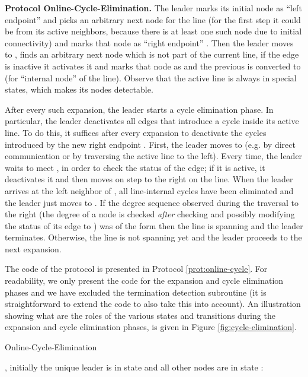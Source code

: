 \documentclass[preprint]{elsarticle}
\begin{document}
\noindent\textbf{Protocol Online-Cycle-Elimination.} The leader marks its initial node as ``left endpoint''  and picks an arbitrary next node for the line (for the first step it could be from its active neighbors, because there is at least one such node due to initial connectivity) and marks that node as ``right endpoint'' . Then the leader moves to , finds an arbitrary next node which is not part of the current line, if the edge is inactive it activates it and marks that node as  and the previous  is converted to  (for ``internal node'' of the line). Observe that the active line is always in special states, which makes its nodes detectable.

After every such expansion, the leader starts a cycle elimination phase. In particular, the leader deactivates all edges that introduce a cycle inside its active line. To do this, it suffices after every expansion to deactivate the cycles introduced by the new right endpoint . First, the leader moves to  (e.g. by direct communication or by traversing the active line to the left). Every time, the leader waits to meet , in order to check the status of the edge; if it is active, it deactivates it and then moves on step to the right on the line. When the leader arrives at the left neighbor of , all line-internal cycles have been eliminated and the leader just moves to . If the degree sequence observed during the traversal to the right (the degree of a node is checked \emph{after} checking and possibly modifying the status of its edge to ) was of the form  then the line is spanning and the leader terminates. Otherwise, the line is not spanning yet and the leader proceeds to the next expansion.

The code of the protocol is presented in Protocol \ref{prot:online-cycle}. For readability, we only present the code for the expansion and cycle elimination phases and we have excluded the termination detection subroutine (it is straightforward to extend the code to also take this into account). An illustration showing what are the roles of the various states and transitions during the expansion and cycle elimination phases, is given in Figure \ref{fig:cycle-elimination}.

\renewcommand{\algorithmiccomment}[1]{// #1}
\begin{algorithm}[!h]
  \caption{Online-Cycle-Elimination}\label{prot:online-cycle}
  \begin{algorithmic}
    \medskip
    \State , initially the unique leader is in state  and all other nodes are in state 
    \State : 
    
    \State {}
    \State {}    
  \end{algorithmic}
\end{algorithm}
\end{document}
